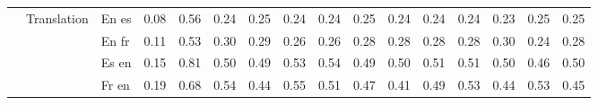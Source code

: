 \begin{center}
\begin{longtable}{lllrrrrrrrrrrrrr}
\cline{2-16}
 & \multirow[t]{4}{*}{Translation} & En es & 0.08 & 0.56 & 0.24 & 0.25 & 0.24 & 0.24 & 0.25 & 0.24 & 0.24 & 0.24 & 0.23 & 0.25 & 0.25 \\
 &  & En fr & 0.11 & 0.53 & 0.30 & 0.29 & 0.26 & 0.26 & 0.28 & 0.28 & 0.28 & 0.28 & 0.30 & 0.24 & 0.28 \\
 &  & Es en & 0.15 & 0.81 & 0.50 & 0.49 & 0.53 & 0.54 & 0.49 & 0.50 & 0.51 & 0.51 & 0.50 & 0.46 & 0.50 \\
 &  & Fr en & 0.19 & 0.68 & 0.54 & 0.44 & 0.55 & 0.51 & 0.47 & 0.41 & 0.49 & 0.53 & 0.44 & 0.53 & 0.45 \\
\cline{1-16} \cline{2-16}
\bottomrule
\end{longtable}

\end{center}
\twocolumn